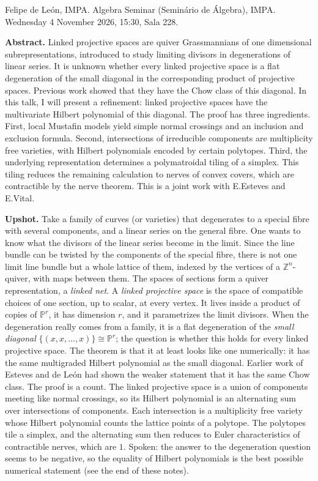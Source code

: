 \noindent
Felipe de Le\'on, IMPA. Algebra Seminar
(Semin\'ario de \'Algebra), IMPA. Wednesday 4
November 2026, 15:30, Sala 228.

\medskip\noindent
{\bf Abstract.} Linked projective spaces are
quiver Grassmannians of one dimensional
subrepresentations, introduced to study
limiting divisors in degenerations of linear
series. It is unknown whether every linked
projective space is a flat degeneration of
the small diagonal in the corresponding
product of projective spaces. Previous work
showed that they have the Chow class of this
diagonal. In this talk, I will present a
refinement: linked projective spaces have the
multivariate Hilbert polynomial of this
diagonal. The proof has three ingredients.
First, local Mustafin models yield simple
normal crossings and an inclusion and
exclusion formula. Second, intersections of
irreducible components are multiplicity free
varieties, with Hilbert polynomials encoded
by certain polytopes. Third, the underlying
representation determines a polymatroidal
tiling of a simplex. This tiling reduces the
remaining calculation to nerves of convex
covers, which are contractible by the nerve
theorem. This is a joint work with E.Esteves
and E.Vital.

\medskip\noindent
{\bf Upshot.} Take a family of curves (or
varieties) that degenerates to a special
fibre with several components, and a linear
series on the general fibre. One wants to
know what the divisors of the linear series
become in the limit. Since the line bundle
can be twisted by the components of the
special fibre, there is not one limit line
bundle but a whole lattice of them, indexed
by the vertices of a $\mathbb{Z}^n$-quiver,
with maps between them. The spaces of
sections form a quiver representation, a
\emph{linked net}. A \emph{linked projective
space} is the space of compatible choices of
one section, up to scalar, at every vertex.
It lives inside a product of copies of
$\mathbb{P}^r$, it has dimension $r$, and it
parametrizes the limit divisors. When the
degeneration really comes from a family, it
is a flat degeneration of the \emph{small
diagonal}
$\{(x,x,\dots,x)\}\cong\mathbb{P}^r$; the
question is whether this holds for every
linked projective space. The theorem is that
it at least looks like one numerically: it
has the same multigraded Hilbert polynomial
as the small diagonal. Earlier work of
Esteves and de Le\'on had shown the weaker
statement that it has the same Chow class.
The proof is a count. The linked projective
space is a union of components meeting like
normal crossings, so its Hilbert polynomial
is an alternating sum over intersections of
components. Each intersection is a
multiplicity free variety whose Hilbert
polynomial counts the lattice points of a
polytope. The polytopes tile a simplex, and
the alternating sum then reduces to Euler
characteristics of contractible nerves, which
are $1$. Spoken: the answer to the
degeneration question seems to be negative,
so the equality of Hilbert polynomials is the
best possible numerical statement (see the
end of these notes).

